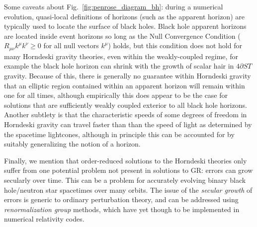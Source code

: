 \documentclass{ws-ijmpd}
\begin{document}
Some caveats about Fig.~\ref{fig:penrose_diagram_bh}:
during a numerical evolution, quasi-local definitions
of horizons (such as the apparent horizon) are typically
used to locate the surface of black holes\cite{Thornburg:2006zb}.
Black hole apparent horizons are located inside event
horizons so long as the Null Convergence Condition
($R_{\mu\nu}k^{\mu}k^{\nu}\geq0$ for all null vectors $k^{\mu}$)
holds\cite{hawking_ellis_1973}, but this condition
does not hold for many Horndeski gravity theories, even
within the weakly-coupled 
regime, for example the black hole
horizon can shrink with the growth of scalar
hair in $4\partial ST$ gravity\cite{Ripley:2019irj,Ripley:2019aqj,
Ripley:2020vpk,East:2020hgw,East:2021bqk}.
Because of this, there is generally no guarantee within Horndeski gravity that
an elliptic region contained within an apparent horizon will
remain within one for all times, although empirically
this does appear to be the case for solutions that 
are sufficiently weakly coupled exterior to all black
hole horizons\cite{Ripley:2019irj,Ripley:2019aqj,
Ripley:2020vpk,East:2020hgw,East:2021bqk,Figueras:2020dzx,Figueras:2021abd}.
Another subtlety is that the characteristic speeds of some degrees of freedom
in Horndeski gravity can travel faster than than the speed of light
as determined by the spacetime lightcones\cite{Akhoury:2011hr},
although in principle this can be accounted for by suitably
generalizing the notion of a horizon\cite{Reall:2021voz}.


Finally, we mention that order-reduced solutions to the Horndeski theories
only suffer from one potential problem not present in solutions
to GR: errors can grow secularly over time.
This can be a problem for accurately evolving binary black hole/neutron star
spacetimes over many orbits.
The issue of the \emph{secular growth} of errors is generic
to ordinary perturbation theory, and can be addressed using
\emph{renormalization group} methods, which have yet though
to be implemented in numerical relativity codes.

\end{document}

